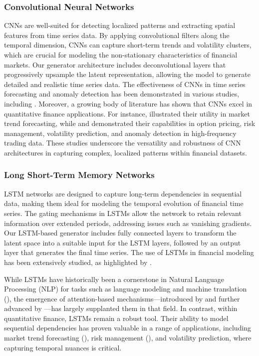 \documentclass{article}
\begin{document}
\subsubsection{Convolutional Neural Networks}

CNNs are well-suited for detecting localized patterns and extracting spatial features from time series data. By applying convolutional filters along the temporal dimension, CNNs can capture short-term trends and volatility clusters, which are crucial for modeling the non-stationary characteristics of financial markets. Our generator architecture includes deconvolutional layers that progressively upsample the latent representation, allowing the model to generate detailed and realistic time series data. The effectiveness of CNNs in time series forecasting and anomaly detection has been demonstrated in various studies, including \textcite{lecun_deep_2015}. Moreover, a growing body of literature has shown that CNNs excel in quantitative finance applications. For instance, \textcite{dixon_high_2017} illustrated their utility in market trend forecasting, while \textcite{liu_option_2023} and \textcite{zhang_deeplob_2019} demonstrated their capabilities in option pricing, risk management, volatility prediction, and anomaly detection in high-frequency trading data. These studies underscore the versatility and robustness of CNN architectures in capturing complex, localized patterns within financial datasets.

\subsubsection{Long Short-Term Memory Networks}

LSTM networks are designed to capture long-term dependencies in sequential data, making them ideal for modeling the temporal evolution of financial time series. The gating mechanisms in LSTMs allow the network to retain relevant information over extended periods, addressing issues such as vanishing gradients. Our LSTM-based generator includes fully connected layers to transform the latent space into a suitable input for the LSTM layers, followed by an output layer that generates the final time series. The use of LSTMs in financial modeling has been extensively studied, as highlighted by \textcite{hochreiter_long_1997}.

While LSTMs have historically been a cornerstone in Natural Language Processing (NLP) for tasks such as language modeling and machine translation (\textcite{sutskever_sequence_2014, fischer_deep_2018}), the emergence of attention-based mechanisms—introduced by \textcite{bahdanau_neural_2016} and further advanced by \textcite{vaswani_attention_2023}—has largely supplanted them in that field. In contrast, within quantitative finance, LSTMs remain a robust tool. Their ability to model sequential dependencies has proven valuable in a range of applications, including market trend forecasting (\textcite{fischer_deep_2018}), risk management (\textcite{bao_deep_2017}), and volatility prediction, where capturing temporal nuances is critical.
\end{document}
